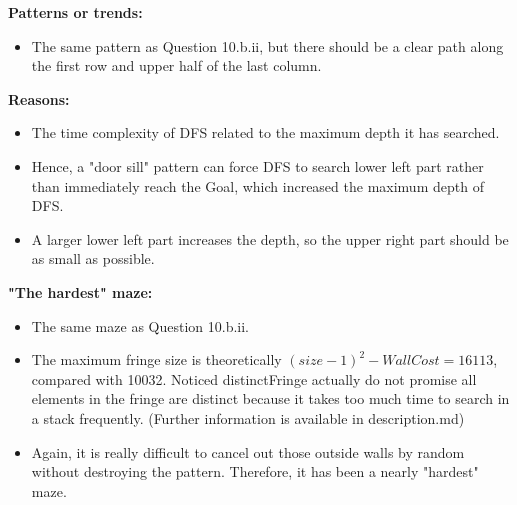 \documentclass[letter]{article}
\begin{document}
\begin{enumerate}[resume]
\begin{enumerate}
\begin{enumerate}
				\textbf{Patterns or trends:} 
				\begin{itemize}
					\item {The same pattern as Question 10.b.ii, but there should be a clear path along the first row and upper half of the last column.}
				\end{itemize}
				
				\textbf{Reasons:} 
				\begin{itemize}
					\item {The time complexity of DFS related to the maximum depth it has searched.}
					\item {Hence, a "door sill" pattern can force DFS to search lower left part rather than immediately reach the Goal, which increased the maximum depth of DFS.}
					\item {A larger lower left part increases the depth, so the upper right part should be as small as possible.}
				\end{itemize}
				
				\textbf{"The hardest" maze:} 
				\begin{itemize}
					\item {The same maze as Question 10.b.ii.}
					\item {The maximum fringe size is theoretically $(size-1)^2-WallCost = 16113$, compared with 10032. Noticed distinctFringe actually do not promise all elements in the fringe are distinct because it takes too much time to search in a stack frequently. (Further information is available in description.md)}
					\item {Again, it is really difficult to cancel out those outside walls by random without destroying the pattern. Therefore, it has been a nearly "hardest" maze.}
				\end{itemize}
			\end{enumerate}
		\end{enumerate}
	\end{enumerate}
\end{document}
